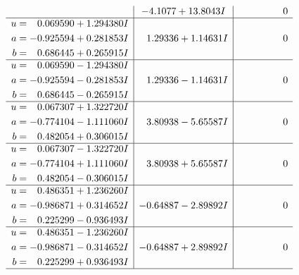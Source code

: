 \documentclass[1p]{elsarticle_modified}
\theoremstyle{definition}
\begin{document}
$$\begin{array}{c|c|c}
 & -4.1077 + 13.8043 I & \phantom{-0.000000 } 0 \\ \hline\begin{aligned}
u &= \phantom{-}0.069590 + 1.294380 I \\
a &= -0.925594 + 0.281853 I \\
b &= \phantom{-}0.686445 + 0.265915 I\end{aligned}
 & \phantom{-}1.29336 + 1.14631 I & \phantom{-0.000000 } 0 \\ \hline\begin{aligned}
u &= \phantom{-}0.069590 - 1.294380 I \\
a &= -0.925594 - 0.281853 I \\
b &= \phantom{-}0.686445 - 0.265915 I\end{aligned}
 & \phantom{-}1.29336 - 1.14631 I & \phantom{-0.000000 } 0 \\ \hline\begin{aligned}
u &= \phantom{-}0.067307 + 1.322720 I \\
a &= -0.774104 - 1.111060 I \\
b &= \phantom{-}0.482054 + 0.306015 I\end{aligned}
 & \phantom{-}3.80938 - 5.65587 I & \phantom{-0.000000 } 0 \\ \hline\begin{aligned}
u &= \phantom{-}0.067307 - 1.322720 I \\
a &= -0.774104 + 1.111060 I \\
b &= \phantom{-}0.482054 - 0.306015 I\end{aligned}
 & \phantom{-}3.80938 + 5.65587 I & \phantom{-0.000000 } 0 \\ \hline\begin{aligned}
u &= \phantom{-}0.486351 + 1.236260 I \\
a &= -0.986871 + 0.314652 I \\
b &= \phantom{-}0.225299 - 0.936493 I\end{aligned}
 & -0.64887 - 2.89892 I & \phantom{-0.000000 } 0 \\ \hline\begin{aligned}
u &= \phantom{-}0.486351 - 1.236260 I \\
a &= -0.986871 - 0.314652 I \\
b &= \phantom{-}0.225299 + 0.936493 I\end{aligned}
 & -0.64887 + 2.89892 I & \phantom{-0.000000 } 0\\
 \hline 
 \end{array}$$\newpage$$\begin{array}{c|c|c}  

\end{array}$$
\end{document}
